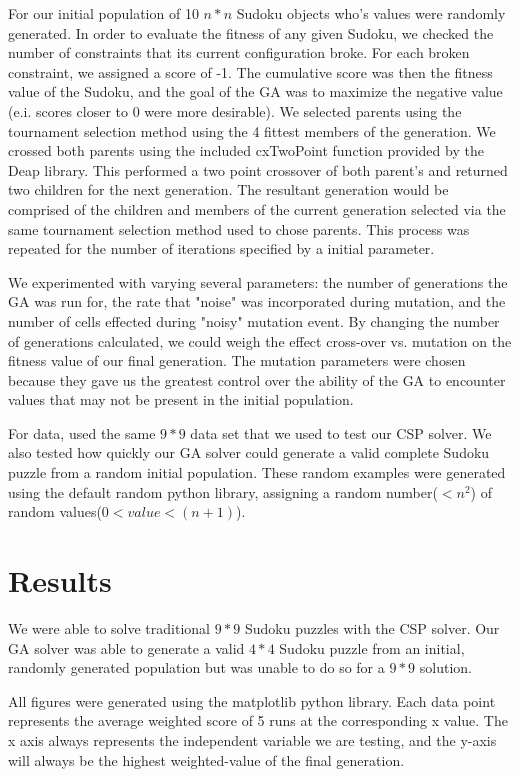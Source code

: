 \documentclass[12pt, conference]{IEEEtran}
\begin{document}
\par
For our initial population of 10 $n*n$ Sudoku objects who's values were randomly generated.
In order to evaluate the fitness of any given Sudoku, we checked the number of constraints that its current configuration broke.
For each broken constraint, we assigned a score of -1.
The cumulative score was then the fitness value of the Sudoku, and the goal of the GA was to maximize the negative value (e.i. scores closer to 0 were more desirable).
We selected parents using the tournament selection method using the 4 fittest members of the generation.
We crossed both parents using the included cxTwoPoint function provided by the Deap library.
This performed a two point crossover of both parent's and returned two children for the next generation.
The resultant generation would be comprised of the children and members of the current generation selected via the same tournament selection method used to chose parents.
This process was repeated for the number of iterations specified by a initial parameter.

\par
We experimented with varying several parameters: the number of generations the GA was run for, the rate that "noise" was incorporated during mutation, and the number of cells effected during "noisy" mutation event.
By changing the number of generations calculated, we could weigh the effect cross-over vs. mutation on the fitness value of our final generation.
The mutation parameters were chosen because they gave us the greatest control over the ability of the GA to encounter values that may not be present in the initial population.

\par
For data, used the same $9*9$ data set that we used to test our CSP solver.
We also tested how quickly our GA solver could generate a valid complete Sudoku puzzle from a random initial population.
These random examples were generated using the default random python library, assigning a random number($<n^2$) of random values($0<value<(n+1)$).

\section{Results}
We were able to solve traditional $9*9$ Sudoku puzzles with the CSP solver.
Our GA solver was able to generate a valid $4*4$ Sudoku puzzle from an initial, randomly generated population but was unable to do so for a $9*9$ solution.

All figures were generated using the matplotlib python library. Each data point represents the average weighted score of 5 runs at the corresponding x value.
The x axis always represents the independent variable we are testing, and the y-axis will always be the highest weighted-value of the final generation.
\end{document}
